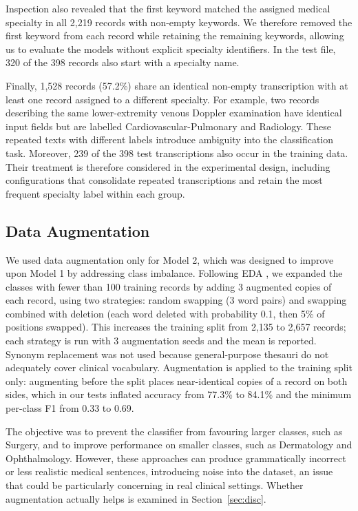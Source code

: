 \documentclass[twocolumn,10pt]{article}
\begin{document}
\noindent Inspection also revealed that the first keyword matched the assigned medical specialty in all 2,219 records with non-empty keywords. We therefore removed the first keyword from each record while retaining the remaining keywords, allowing us to evaluate the models without explicit specialty identifiers. In the test file, 320 of the 398 records also start with a specialty name.

\noindent Finally, 1,528 records (57.2\%) share an identical non-empty transcription with at least one record assigned to a different specialty. For example, two records describing the same lower-extremity venous Doppler examination have identical input fields but are labelled Cardiovascular-Pulmonary and Radiology. These repeated texts with different labels introduce ambiguity into the classification task. Moreover, 239 of the 398 test transcriptions also occur in the training data. Their treatment is therefore considered in the experimental design, including configurations that consolidate repeated transcriptions and retain the most frequent specialty label within each group.

\subsection{Data Augmentation}

\noindent We used data augmentation only for Model 2, which was designed to improve upon Model 1 by addressing class imbalance. Following \ac{EDA} \cite{wei2019eda}, we expanded the classes with fewer than 100 training records by adding 3 augmented copies of each record, using two strategies: random swapping (3 word pairs) and swapping combined with deletion (each word deleted with probability 0.1, then 5\% of positions swapped). This increases the training split from 2,135 to 2,657 records; each strategy is run with 3 augmentation seeds and the mean is reported. Synonym replacement was not used because general-purpose thesauri do not adequately cover clinical vocabulary. Augmentation is applied to the training split only: augmenting before the split places near-identical copies of a record on both sides, which in our tests inflated accuracy from 77.3\% to 84.1\% and the minimum per-class F1 from 0.33 to 0.69.

\noindent The objective was to prevent the classifier from favouring larger classes, such as Surgery, and to improve performance on smaller classes, such as Dermatology and Ophthalmology. However, these approaches can produce grammatically incorrect or less realistic medical sentences, introducing noise into the dataset, an issue that could be particularly concerning in real clinical settings. Whether augmentation actually helps is examined in Section~\ref{sec:disc}.
\end{document}
